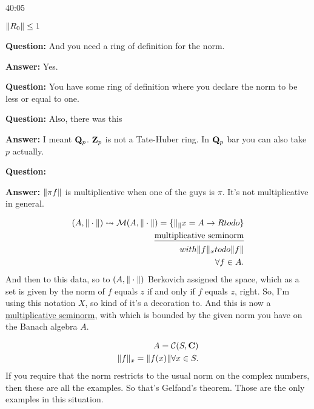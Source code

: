 \begin{example}
\begin{unfinished}{40:05}
\begin{example}
 $\| R_0 \| \leq 1$
\end{example}

\textbf{Question:} And you need a ring of definition for the norm. 

\textbf{Answer:} Yes.

\textbf{Question:} You have some ring of definition where you declare the norm to be less or equal to one.


\textbf{Question:} Also, there was this 

\textbf{Answer:} I meant $\mathbf Q_p$. $\mathbf Z_p$ is not a Tate-Huber ring. In $\mathbf Q_p$ bar  you can also take $p$ actually. 


\textbf{Question:} 

\textbf{Answer:} $\| \pi f \|$ is multiplicative when one of the guys is $\pi$. It's not multiplicative in general.


\begin{align*}
(A, \| \cdot \|) \leadsto \mathcal{M}(A, \| \cdot \|) = \{ \| _ \|{x} = A \to R todo \} \\
\text{\underline{multiplicative seminorm}} \\
with \| f \|_x todo \| f \| \\
\forall f \in A.
\end{align*}
And then to this data, so to $(A, \| \cdot \|)$ Berkovich assigned the space, which as a set is given by the norm of $f$ equals $z$ if and only if $f$ equals $z$, right.
So, I'm using this notation $X$, so kind of it's a decoration to. And this is now a \underline{multiplicative seminorm}, with which is bounded by the given norm you have on the Banach algebra $A$.

\begin{example} 
\begin{align*}
A = \mathcal{C}(S, \mathbf C) \\
\| f \|_x = \| f(x) \| \forall x \in S.
\end{align*}
If you require that the norm restricts to the usual norm on the complex numbers, then these are all the examples. So that's Gelfand's theorem. Those are the only examples in this situation. 


\end{example}
\end{unfinished}
\end{example}
